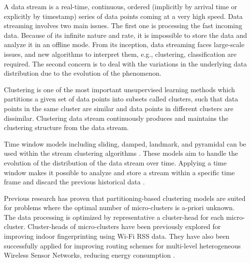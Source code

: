 A data stream is a real-time, continuous, ordered (implicitly by arrival time or explicitly by timestamp) series of data points coming at a very high speed. Data streaming involves two main issues. The first one is processing the fast incoming data. Because of its infinite nature and rate, it is impossible to store the data and analyze it in an offline mode. From its inception, data streaming faces large-scale issues, and new algorithms to interpret them, e.g., clustering, classification are required.
The second concern is to deal with the variations in the underlying data distribution due to the evolution of the phenomenon.

Clustering is one of the most important unsupervised learning methods which partitions a given set of data points into subsets called clusters, such that data points in the same cluster are similar and data points in different clusters are dissimilar. Clustering data stream continuously produces and maintains the clustering structure from the data stream.

Time window models including sliding, damped, landmark, and pyramidal can be used within the stream clustering algorithms  \cite{nguyen2015survey}. These models aim to handle the evolution of the distribution of the data stream over time. Applying a time window makes it possible to analyze and store a stream within a specific time frame and discard the previous historical data \cite{mansalis2018evaluation}.

Previous research has proven that partitioning-based clustering models are suited for problems where the optimal number of micro-clusters is a-priori unknown. The data processing is optimized by representative a cluster-head for each micro-cluster. Cluster-heads of micro-clusters have been previously explored for improving indoor fingerprinting using Wi-Fi RSS data\cite{hu2015improving, subedi2019improving}. They have also been successfully applied for improving routing schemes for multi-level heterogeneous Wireless Sensor Networks, reducing energy consumption \cite{wang2019affinity}. 


